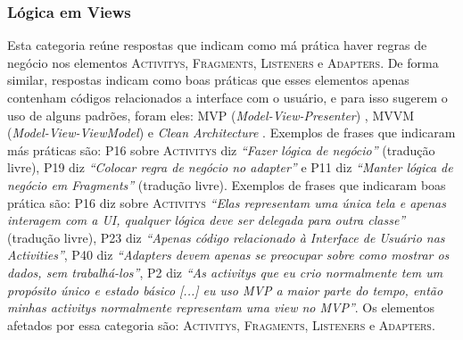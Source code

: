 
\subsubsection{L\'ogica em Views}
Esta categoria re\'une respostas que indicam como m\'a pr\'atica haver regras de neg\'ocio nos elementos \textsc{Activitys}, \textsc{Fragments}, \textsc{Listeners} e \textsc{Adapters}. De forma similar, respostas indicam como boas pr\'aticas que esses elementos apenas contenham c\'odigos relacionados a interface com o usuário, e para isso sugerem o uso de alguns padrões, foram eles: MVP (\textit{Model-View-Presenter}) \cite{MartinFowlerGUIArchitectures, WikipediaMVP}, MVVM (\textit{Model-View-ViewModel}) \cite{WikipediaMVVM} e \textit{Clean Architecture} \cite{CleanArchitecture}. Exemplos de frases que indicaram m\'as pr\'aticas s\~ao: P16 sobre \textsc{Activitys} diz \textit{``Fazer l\'ogica de neg\'ocio''} (tradu\c{c}\~ao livre), P19 diz \textit{``Colocar regra de neg\'ocio no adapter''} e P11 diz \textit{``Manter l\'ogica de neg\'ocio em Fragments''} (tradu\c{c}\~ao livre). Exemplos de frases que indicaram boas pr\'atica s\~ao: P16 diz sobre \textsc{Activitys} \textit{``Elas representam uma \'unica tela e apenas interagem com a UI, qualquer l\'ogica deve ser delegada para outra classe''} (tradu\c{c}\~ao livre), P23 diz \textit{``Apenas c\'odigo relacionado \`a Interface de Usu\'ario nas Activities''}, P40 diz \textit{``Adapters devem apenas se preocupar sobre como mostrar os dados, sem trabalh\'a-los''}, P2 diz \textit{``As activitys que eu crio normalmente tem um propósito único e estado básico [...] eu uso MVP a maior parte do tempo, então minhas activitys normalmente representam uma view no MVP''}. Os elementos afetados por essa categoria são: \textsc{Activitys}, \textsc{Fragments}, \textsc{Listeners} e \textsc{Adapters}. 

